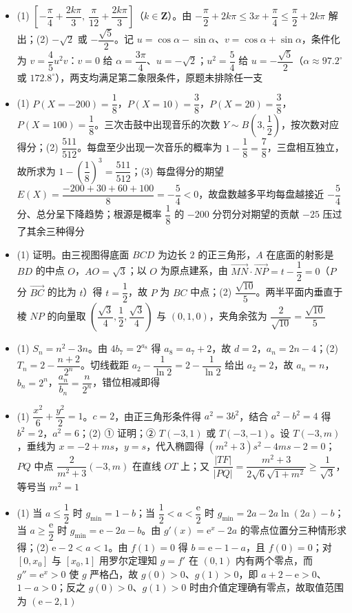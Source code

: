 \begin{itemize}[leftmargin=2.6em]
  \item[\textbf{16.}] (1) $\left[-\dfrac\pi4+\dfrac{2k\pi}3,\ \dfrac\pi{12}+\dfrac{2k\pi}3\right]$（$k\in\mathbf Z$）。由 $-\dfrac\pi2+2k\pi\leqslant 3x+\dfrac\pi4\leqslant\dfrac\pi2+2k\pi$ 解出；(2) $-\sqrt2$ 或 $-\dfrac{\sqrt5}2$。记 $u=\cos\alpha-\sin\alpha$、$v=\cos\alpha+\sin\alpha$，条件化为 $v=\dfrac45u^2v$：$v=0$ 给 $\alpha=\dfrac{3\pi}4$、$u=-\sqrt2$；$u^2=\dfrac54$ 给 $u=-\dfrac{\sqrt5}2$（$\alpha\approx 97.2^\circ$ 或 $172.8^\circ$），两支均满足第二象限条件，原题未排除任一支
  \item[\textbf{17.}] (1) $P(X=-200)=\dfrac18$，$P(X=10)=\dfrac38$，$P(X=20)=\dfrac38$，$P(X=100)=\dfrac18$。三次击鼓中出现音乐的次数 $Y\sim B\left(3,\dfrac12\right)$，按次数对应得分；(2) $\dfrac{511}{512}$。每盘至少出现一次音乐的概率为 $1-\dfrac18=\dfrac78$，三盘相互独立，故所求为 $1-\left(\dfrac18\right)^3=\dfrac{511}{512}$；(3) 每盘得分的期望 $E(X)=\dfrac{-200+30+60+100}8=-\dfrac54<0$，故盘数越多平均每盘越接近 $-\dfrac54$ 分、总分呈下降趋势；根源是概率 $\dfrac18$ 的 $-200$ 分罚分对期望的贡献 $-25$ 压过了其余三种得分
  \item[\textbf{18.}] (1) 证明。由三视图得底面 $BCD$ 为边长 $2$ 的正三角形，$A$ 在底面的射影是 $BD$ 的中点 $O$，$AO=\sqrt3$；以 $O$ 为原点建系，由 $\overrightarrow{MN}\cdot\overrightarrow{NP}=t-\dfrac12=0$（$P$ 分 $\overrightarrow{BC}$ 的比为 $t$）得 $t=\dfrac12$，故 $P$ 为 $BC$ 中点；(2) $\dfrac{\sqrt{10}}5$。两半平面内垂直于棱 $NP$ 的向量取 $\left(\dfrac{\sqrt3}4,\dfrac12,\dfrac{\sqrt3}4\right)$ 与 $(0,1,0)$，夹角余弦为 $\dfrac{2}{\sqrt{10}}=\dfrac{\sqrt{10}}5$
  \item[\textbf{19.}] (1) $S_n=n^2-3n$。由 $4b_7=2^{a_8}$ 得 $a_8=a_7+2$，故 $d=2$，$a_n=2n-4$；(2) $T_n=2-\dfrac{n+2}{2^n}$。切线截距 $a_2-\dfrac1{\ln2}=2-\dfrac1{\ln2}$ 给出 $a_2=2$，故 $a_n=n$，$b_n=2^n$，$\dfrac{a_n}{b_n}=\dfrac n{2^n}$，错位相减即得
  \item[\textbf{20.}] (1) $\dfrac{x^2}6+\dfrac{y^2}2=1$。$c=2$，由正三角形条件得 $a^2=3b^2$，结合 $a^2-b^2=4$ 得 $b^2=2$，$a^2=6$；(2) ① 证明；② $T(-3,1)$ 或 $T(-3,-1)$。设 $T(-3,m)$，垂线为 $x=-2+ms$，$y=s$，代入椭圆得 $(m^2+3)s^2-4ms-2=0$；$PQ$ 中点 $\dfrac{2}{m^2+3}(-3,m)$ 在直线 $OT$ 上；又 $\dfrac{|TF|}{|PQ|}=\dfrac{m^2+3}{2\sqrt6\sqrt{1+m^2}}\geqslant\dfrac1{\sqrt3}$，等号当 $m^2=1$
  \item[\textbf{21.}] (1) 当 $a\leqslant\dfrac12$ 时 $g_{\min}=1-b$；当 $\dfrac12<a<\dfrac{\mathrm e}2$ 时 $g_{\min}=2a-2a\ln(2a)-b$；当 $a\geqslant\dfrac{\mathrm e}2$ 时 $g_{\min}=\mathrm e-2a-b$。由 $g'(x)=\mathrm e^x-2a$ 的零点位置分三种情形求得；(2) $\mathrm e-2<a<1$。由 $f(1)=0$ 得 $b=\mathrm e-1-a$，且 $f(0)=0$；对 $[0,x_0]$ 与 $[x_0,1]$ 用罗尔定理知 $g=f'$ 在 $(0,1)$ 内有两个零点，而 $g''=\mathrm e^x>0$ 使 $g$ 严格凸，故 $g(0)>0$、$g(1)>0$，即 $a+2-\mathrm e>0$、$1-a>0$；反之 $g(0)>0$、$g(1)>0$ 时由介值定理确有零点，故取值范围为 $(\mathrm e-2,1)$
\end{itemize}
